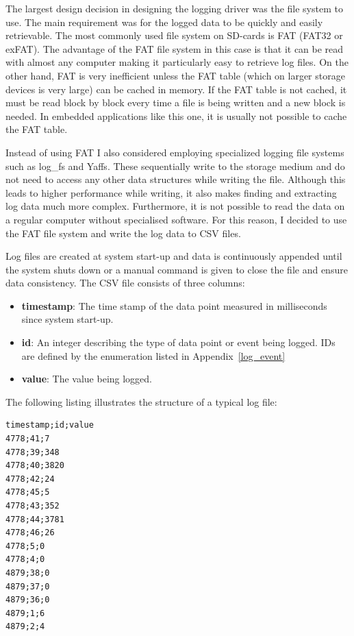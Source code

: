 The largest design decision in designing the logging driver was the file system to use. The main requirement was for the logged data to be quickly and easily retrievable. The most commonly used file system on SD-cards is FAT (FAT32 or exFAT). The advantage of the FAT file system in this case is that it can be read with almost any computer making it particularly easy to retrieve log files. On the other hand, FAT is very inefficient unless the FAT table (which on larger storage devices is very large) can be cached in memory. If the FAT table is not cached, it must be read block by block every time a file is being written and a new block is needed. In embedded applications like this one, it is usually not possible to cache the FAT table.

Instead of using FAT I also considered employing specialized logging file systems such as log\_fs\cite{log_fs} and Yaffs\cite{yaffs}. These sequentially write to the storage medium and do not need to access any other data structures while writing the file. Although this leads to higher performance while writing, it also makes finding and extracting log data much more complex. Furthermore, it is not possible to read the data on a regular computer without specialised software. For this reason, I decided to use the FAT file system and write the log data to CSV files.

Log files are created at system start-up and data is continuously appended until the system shuts down or a manual command is given to close the file and ensure data consistency. The CSV file consists of three columns:

\begin{itemize}
    \item \textbf{timestamp}: The time stamp of the data point measured in milliseconds since system start-up.
    \item \textbf{id}: An integer describing the type of data point or event being logged. IDs are defined by the enumeration listed in Appendix~\ref{log_event}
    \item \textbf{value}: The value being logged.
\end{itemize}

The following listing illustrates the structure of a typical log file:

\begin{verbatim}
timestamp;id;value
4778;41;7
4778;39;348
4778;40;3820
4778;42;24
4778;45;5
4778;43;352
4778;44;3781
4778;46;26
4778;5;0
4778;4;0
4879;38;0
4879;37;0
4879;36;0
4879;1;6
4879;2;4
\end{verbatim}

